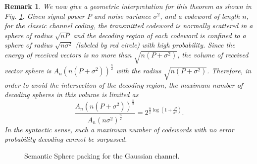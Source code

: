 \documentclass[12pt, draftclsnofoot,onecolumn]{IEEEtran}
\newtheorem{remark}{\bf{Remark}}
\begin{document}
\begin{remark}
We now give a geometric interpretation for this theorem as shown in Fig. \ref{Semantic_Sphere_packing}. Given signal power $P$ and noise variance $\sigma^2$, and a codeword of length $n$, for the classic channel coding, the transmitted codeword is normally scattered in a sphere of radius $\sqrt{nP}$ and the decoding region of each codeword is confined to a sphere of radius $\sqrt{n\sigma^2}$ (labeled by red circle) with high probability. Since the energy of received vectors is no more than $\sqrt{n(P+\sigma^2)}$, the volume of received vector sphere is $A_n(n(P+\sigma^2))^{\frac{n}{2}}$ with the radius $\sqrt{n(P+\sigma^2)}$. Therefore, in order to avoid the intersection of the decoding region, the maximum number of decoding spheres in this volume is limited as
\begin{equation}
\frac{A_n(n(P+\sigma^2))^{\frac{n}{2}}}{A_n(n\sigma^2)^{\frac{n}{2}}}=2^{\frac{n}{2}\log (1+\frac{P}{\sigma^2})}.
\end{equation}
In the syntactic sense, such a maximum number of codewords with no error probability decoding cannot be surpassed.

\end{remark}
\begin{figure}[htbp]
\setlength{\abovecaptionskip}{0.cm}
\setlength{\belowcaptionskip}{-0.cm}
  \caption{Semantic Sphere packing for the Gaussian channel.}\label{Semantic_Sphere_packing}
\end{figure}
\end{document}

